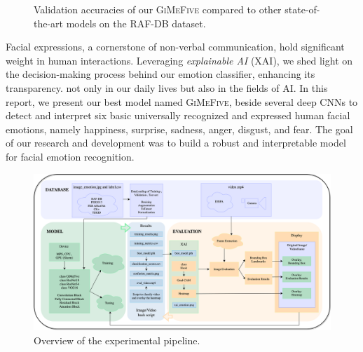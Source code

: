 \begin{figure}[ht]
  \centering
  \caption{Validation accuracies of our \textsc{GiMeFive} compared to other state-of-the-art models on the RAF-DB dataset.} 
  \label{fig:acc}
\end{figure}

Facial expressions, a cornerstone of non-verbal communication, hold significant weight in human interactions. 
Leveraging \textit{explainable AI} (XAI), 
we shed light on the decision-making process behind our emotion classifier, 
enhancing its transparency. 
not only in our daily lives but also in the fields of AI. 
In this report, we present our best model named \textsc{GiMeFive}, 
beside several deep CNNs to detect and interpret six basic universally recognized and expressed human facial emotions, 
namely happiness, surprise, sadness, anger, disgust, and fear. 
The goal of our research and development was to build a robust and interpretable model for facial emotion recognition. 

\begin{figure}[ht]
  \centering
   \includegraphics[width=\linewidth]{pipeline.png}
   \caption{Overview of the experimental pipeline.} 
   \label{fig:pipeline}
\end{figure}


